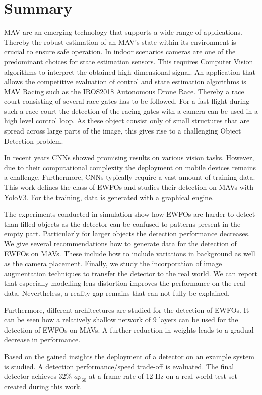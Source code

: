 \chapter*{Summary}

\ac{MAV} are an emerging technology that supports a wide range of applications. Thereby the robust estimation of an \ac{MAV}'s state within its environment is crucial to ensure safe operation. In  indoor scenarios cameras are one of the predominant choices for state estimation sensors. This requires Computer Vision algorithms to interpret the obtained high dimensional signal. An application that allows the competitive evaluation of control and state estimation algorithms is \ac{MAV} Racing such as the \ac{IROS}2018 Autonomous Drone Race. Thereby a race court consisting of several race gates has to be followed. For a fast flight during such a race court the detection of the racing gates with a camera can be used in a high level control loop. As these object consist only of small structures that are spread across large parts of the image, this gives rise to a challenging Object Detection problem.

In recent years \acp{CNN} showed promising results on various vision tasks. However, due to their computational complexity the deployment on mobile devices remains a challenge. Furthermore, \acp{CNN} typically require a vast amount of training data. This work defines the class of \acp{EWFO} and studies their detection on \acp{MAV} with \ac{Yolo}V3. For the training, data is generated with a graphical engine. 

The experiments conducted in simulation show how \acp{EWFO} are harder to detect than filled objects as the detector can be confused to patterns present in the empty part. Particularly for larger objects the detection performance decreases. We give several recommendations how to generate data for the detection of \acp{EWFO} on \acp{MAV}. These include how to include variations in background as well as the camera placement. Finally, we study the incorporation of image augmentation techniques to transfer the detector to the real world. We can report that especially modelling lens distortion improves the performance on the real data. Nevertheless, a reality gap remains that can not fully be explained.

Furthermore, different architectures are studied for the detection of \acp{EWFO}. It can be seen how a relatively shallow network of 9 layers can be used for the detection of \acp{EWFO} on \acp{MAV}. A further reduction in weights leads to a gradual decrease in performance. 

Based on the gained insights the deployment of a detector on an example system is studied. A detection performance/speed trade-off is evaluated. The final detector achieves 32\% $ap_{60}$ at a frame rate of 12 Hz on a real world test set created during this work.


